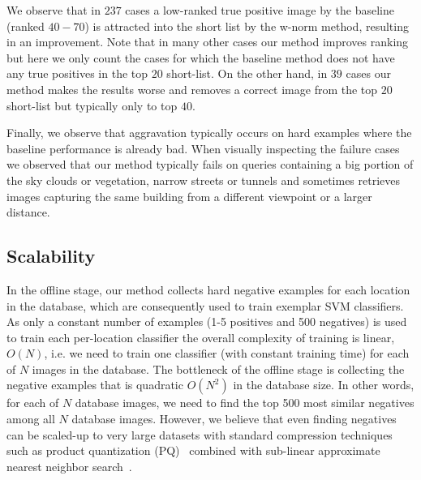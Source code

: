      {
        We observe that in $237$ cases a low-ranked true positive image by the baseline (ranked $40-70$)  is attracted into the short list by the w-norm method, resulting in an improvement.  Note that in many other cases our method improves ranking but here we only count the cases for which the baseline method does not have any true positives in the top $20$ short-list. On the other hand, in $39$ cases our method makes the results worse and removes a correct image from the top $20$ short-list but typically only to top $40$.
      }

      {
        Finally, we observe that aggravation typically occurs on hard examples where the baseline performance is already bad. When visually inspecting the failure cases we observed that our method typically fails on queries containing a big portion of the sky clouds or vegetation, narrow streets or tunnels and sometimes retrieves images capturing the same building from a different viewpoint or a larger distance.
      }



  \subsection{{Scalability}}
  \label{sec:scalability}
    {
      In the offline stage, our method collects hard negative examples for each location in the database, which are consequently used to train exemplar SVM classifiers. 
      As only a constant number of examples (1-5 positives and 500 negatives) is used to train each per-location classifier the overall complexity of training is linear, $O(N)$, i.e. we need to train one classifier (with constant training time) for each of $N$ images in the database. The bottleneck of the offline stage is collecting the negative examples that is quadratic $O(N^2)$ in the database size. In other words, for each of $N$ database images, we need to find the top 500 most similar negatives among all $N$ database images.
      However, we believe that even finding negatives can be scaled-up to very large datasets with standard compression techniques such as product quantization (PQ)~\cite{Jegou11} combined with sub-linear approximate nearest neighbor search~\cite{Flann2014}.
    }

